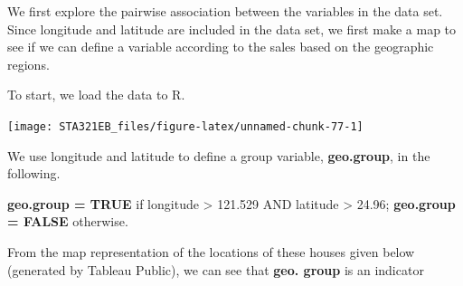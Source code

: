 \documentclass[
]{book}
\newenvironment{Shaded}{\begin{snugshade}}{\end{snugshade}}
\newcommand{\AttributeTok}[1]{\textcolor[rgb]{0.13,0.29,0.53}{#1}}
\newcommand{\CommentTok}[1]{\textcolor[rgb]{0.56,0.35,0.01}{\textit{#1}}}
\newcommand{\ConstantTok}[1]{\textcolor[rgb]{0.56,0.35,0.01}{#1}}
\newcommand{\DecValTok}[1]{\textcolor[rgb]{0.00,0.00,0.81}{#1}}
\newcommand{\FloatTok}[1]{\textcolor[rgb]{0.00,0.00,0.81}{#1}}
\newcommand{\FunctionTok}[1]{\textcolor[rgb]{0.13,0.29,0.53}{\textbf{#1}}}
\newcommand{\NormalTok}[1]{#1}
\newcommand{\OtherTok}[1]{\textcolor[rgb]{0.56,0.35,0.01}{#1}}
\newcommand{\SpecialCharTok}[1]{\textcolor[rgb]{0.81,0.36,0.00}{\textbf{#1}}}
\newcommand{\StringTok}[1]{\textcolor[rgb]{0.31,0.60,0.02}{#1}}
\begin{document}
We first explore the pairwise association between the variables in the data set. Since longitude and latitude are included in the data set, we first make a map to see if we can define a variable according to the sales based on the geographic regions.

To start, we load the data to R.

\begin{Shaded}
\end{Shaded}

\begin{center}\texttt{[image: STA321EB\_files/figure-latex/unnamed-chunk-77-1]} \end{center}

We use longitude and latitude to define a group variable, \textbf{geo.group}, in the following.

\textbf{geo.group = TRUE} if longitude \textgreater{} 121.529 AND latitude \textgreater{} 24.96;
\textbf{geo.group = FALSE} otherwise.

From the map representation of the locations of these houses given below (generated by Tableau Public), we can see that \textbf{geo. group} is an indicator
\end{document}
